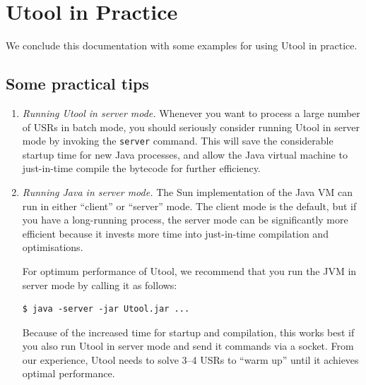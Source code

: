 
\section{Utool in Practice} \label{sec:practice}

We conclude this documentation with some examples for using Utool in
practice.

\subsection{Some practical tips} \label{sec:practice-some-practical-tips}

\begin{enumerate}
\item \textit{Running Utool in server mode.} Whenever you want to
process a large number of USRs in batch mode, you should seriously
consider running Utool in server mode by invoking the \verb?server?
command. This will save the considerable startup time for new Java
processes, and allow the Java virtual machine to just-in-time compile
the bytecode for further efficiency.

\item \textit{Running Java in server mode.} The Sun implementation of
the Java VM can run in either ``client'' or ``server'' mode. The
client mode is the default, but if you have a long-running process,
the server mode can be significantly more efficient because it invests
more time into just-in-time compilation and optimisations.

For optimum performance of Utool, we recommend that you run the JVM in
server mode by calling it as follows:
\begin{verbatim}
$ java -server -jar Utool.jar ...
\end{verbatim}

Because of the increased time for startup and compilation, this works
best if you also run Utool in server mode and send it commands via a
socket. From our experience, Utool needs to solve 3--4 USRs to ``warm
up'' until it achieves optimal performance.




\end{enumerate}
